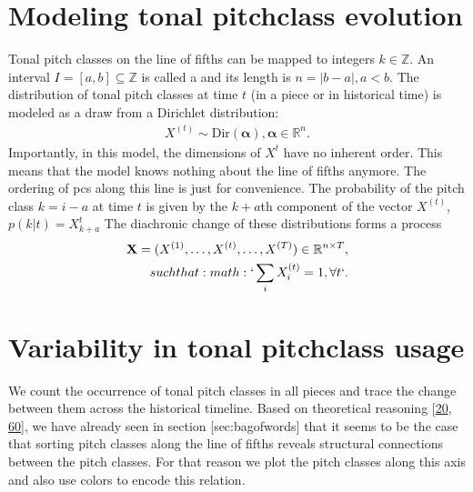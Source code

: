 \documentclass[letterpaper,10pt,english]{sphinxmanual}
\begin{document}
\section{Modeling tonal pitch\sphinxhyphen{}class evolution}
\label{\detokenize{history:modeling-tonal-pitch-class-evolution}}
\sphinxAtStartPar
Tonal pitch classes on the line of fifths can be mapped to integers
\(k \in \mathbb Z\). An interval \(I=[a,b]\subseteq\mathbb Z\)
is called a  and its length is
\(n=|b-a|, a<b\). The distribution of tonal pitch classes at time
\(t\) (in a piece or in historical time) is modeled as a draw from a
Dirichlet distribution:
\begin{equation*}
\begin{split}X^{(t)}\sim \mathrm{Dir}(\mathbf{\alpha}), \mathbf{\alpha}\in\mathbb R^n.\end{split}
\end{equation*}
\sphinxAtStartPar
Importantly, in this model, the dimensions of \(X^{t}\) have no
inherent order. This means that the model knows nothing about the line
of fifths anymore. The ordering of pcs along this line is just for
convenience. The probability of the pitch class \(k = i-a\) at time
\(t\) is given by the \(k+a\)th component of the vector
\(X^{(t)}\), \(p(k | t)=X_{k+a}^{t}\) The diachronic change of
these distributions forms a process
\begin{align*}\!\begin{aligned}
\mathbf{X}=(X^{(1)},\dots,X^{(t)},\dots,X^{(T)})\in \mathbb R^{n\times T},\\
such that :math:`\sum_i X_i^{(t)}=1,\forall t`.\\
\end{aligned}\end{align*}

\section{Variability in tonal pitch\sphinxhyphen{}class usage}
\label{\detokenize{history:variability-in-tonal-pitch-class-usage}}
\sphinxAtStartPar
We count the occurrence of tonal pitch classes in all pieces and trace
the change between them across the historical timeline. Based on
theoretical reasoning {[}\hyperlink{cite.8_bibliography:id65}{20}, \hyperlink{cite.8_bibliography:id42}{60}{]},
we have already seen in section {[}sec:bagofwords{]} that it seems to be the
case that sorting pitch classes along the line of fifths reveals
structural connections between the pitch classes. For that reason we
plot the pitch classes along this axis and also use colors to encode
this relation.
\end{document}
